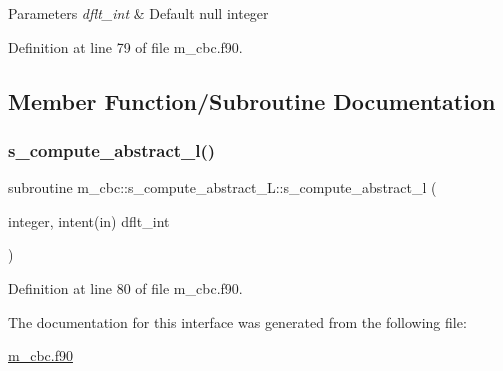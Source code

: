 \begin{DoxyParams}{Parameters}
{\em dflt\+\_\+int} & Default null integer \\
\hline
\end{DoxyParams}


Definition at line 79 of file m\+\_\+cbc.\+f90.



\subsection{Member Function/\+Subroutine Documentation}
\mbox{\label{interfacem__cbc_1_1s__compute__abstract___l_a0da994a6412d8725ee77753ebfcdbd86}} 
\subsubsection{\texorpdfstring{s\+\_\+compute\+\_\+abstract\+\_\+l()}{s\_compute\_abstract\_l()}}
{\footnotesize\ttfamily subroutine m\+\_\+cbc\+::s\+\_\+compute\+\_\+abstract\+\_\+\+L\+::s\+\_\+compute\+\_\+abstract\+\_\+l (\begin{DoxyParamCaption}\item[{integer, intent(in)}]{dflt\+\_\+int }\end{DoxyParamCaption})}



Definition at line 80 of file m\+\_\+cbc.\+f90.



The documentation for this interface was generated from the following file\+:\begin{DoxyCompactItemize}
\item 
\hyperlink{m__cbc_8f90}{m\+\_\+cbc.\+f90}\end{DoxyCompactItemize}
